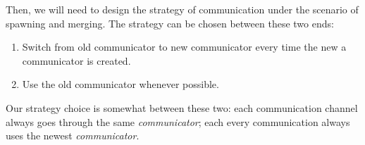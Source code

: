 Then, we will need to design the strategy of communication under the scenario of spawning and merging. The strategy can be chosen between these two ends:
\begin{enumerate}
	\item Switch from old communicator to new communicator every time the new a communicator is created. 
	\item Use the old communicator whenever possible. 
\end{enumerate}

Our strategy choice is somewhat between these two: each communication channel always goes through the same \textit{communicator}; each every communication always uses the newest \textit{communicator}. 
